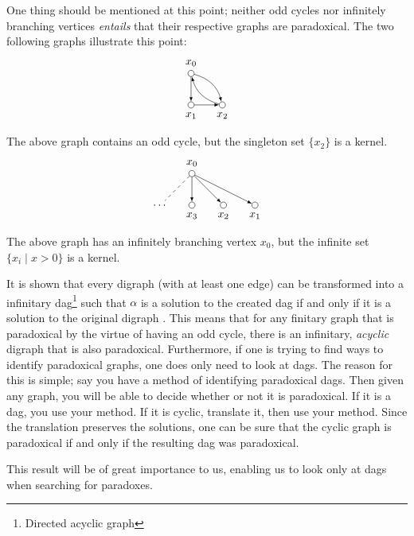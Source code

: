 One thing should be mentioned at this point; neither odd cycles nor infinitely branching vertices \textit{entails} that their respective graphs are paradoxical.
The two following graphs illustrate this point:
\begin{align}
  \begin{aligned}
    \begin{tikzpicture}
      [
      point/.style={circle,draw,inner sep=0pt,minimum size=2mm},
      collection/.style={thick,rectangle,draw,inner sep=0pt,minimum height=14mm, minimum width= 9mm}
      ]
      \node (0) at (0,1) [point,label=above:$x_0$] {};
      \node (1) at (0,0) [point,label=below:$x_1$] {};
      \node (2) at (1,0) [point,label=below:$x_2$] {};
      \draw [-latex] (0) to (1);
      \draw [-latex] (1) to (2);
      \draw [-latex, bend left] (2) to (0);
      \draw [-latex, bend left] (0) to (2);
    \end{tikzpicture}
  \end{aligned}
\end{align}
The above graph contains an odd cycle, but the singleton set $\{x_2\}$ is a kernel.
\begin{align}
  \begin{aligned}
    \begin{tikzpicture}
      [
      point/.style={circle,draw,inner sep=0pt,minimum size=2mm},
      collection/.style={thick,rectangle,draw,inner sep=0pt,minimum height=14mm, minimum width= 9mm}
      ]
      \node (0) at (1,2) [point,label=above:$x_0$] {};
      \node (1) at (3,1) [point,label=below:$x_1$] {};
      \node (2) at (2,1) [point,label=below:$x_2$] {};
      \node (3) at (1,1) [point,label=below:$x_3$] {};
      \node (4) at (0,1) [] {$\dots$};
      \draw [-latex] (0) to (1);
      \draw [-latex] (0) to (2);
      \draw [-latex] (0) to (3);
      \draw [dashed] (0) to (4);
    \end{tikzpicture}
  \end{aligned}
\end{align}
The above graph has an infinitely branching vertex $x_0$, but the infinite set $\{x_i \;|\; x > 0\}$ is a kernel.

It is shown that every digraph (with at least one edge) can be transformed into a infinitary dag\footnote{Directed acyclic graph} such that $\alpha$ is a solution to the created dag if and only if it is a solution to the original digraph \cite{apal-digraph}.
This means that for any finitary graph that is paradoxical by the virtue of having an odd cycle, there is an infinitary, \textit{acyclic} digraph that is also paradoxical.
Furthermore, if one is trying to find ways to identify paradoxical graphs, one does only need to look at dags.
The reason for this is simple; say you have a method of identifying paradoxical dags.
Then given any graph, you will be able to decide whether or not it is paradoxical.
If it is a dag, you use your method.
If it is cyclic, translate it, then use your method.
Since the translation preserves the solutions, one can be sure that the cyclic graph is paradoxical if and only if the resulting dag was paradoxical.

This result will be of great importance to us, enabling us to look only at dags when searching for paradoxes.
